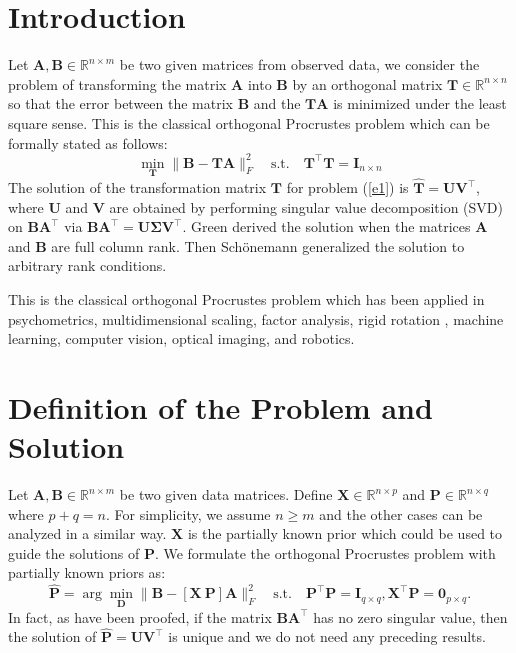 \documentclass[titlepage,11pt,twoside]{article}
\begin{document}
\section{Introduction}
Let $\mathbf{A},\mathbf{B}\in\mathbb{R}^{n\times m}$ be two given matrices from observed data, we consider the problem of transforming the matrix $\mathbf{A}$ into $\mathbf{B}$ by an orthogonal matrix $\mathbf{T}\in\mathbb{R}^{n\times n}$ so that the error between the matrix $\mathbf{B}$ and the $\mathbf{T}\mathbf{A}$ is minimized under the least square sense. This is the classical orthogonal Procrustes problem \cite{procrustesprogram} which can be formally stated as follows:
\begin{equation}\label{e1}
\min_{\mathbf{T}}\|\mathbf{B}-\mathbf{T}\mathbf{A}\|_{F}^{2}
\quad
\text{s.t.}
\quad
\mathbf{T}^{\top}\mathbf{T} = \mathbf{I}_{n\times n}
\end{equation}
The solution of the transformation matrix $\mathbf{T}$ for problem (\ref{e1}) is
$\mathbf{\hat{T}}=\mathbf{U}\mathbf{V}^{\top}$, where $\mathbf{U}$ and $\mathbf{V}$ are obtained by performing singular value decomposition (SVD) on $\mathbf{B}\mathbf{A}^{\top}$ via $\mathbf{B}\mathbf{A}^{\top}=\mathbf{U}\mathbf{\Sigma}\mathbf{V}^{\top}$. Green \cite{green1952orthogonal} derived the solution when the matrices $\mathbf{A}$ and $\mathbf{B}$ are full column rank. Then Sch{\"o}nemann \cite{schonemann1966generalized} generalized the solution to arbitrary rank conditions.


This is the classical orthogonal Procrustes problem \cite{procrustesprogram} which has been applied in psychometrics, multidimensional scaling, factor analysis, rigid rotation \cite{Berge2006}, machine learning, computer vision, optical imaging, and robotics.

\section{Definition of the Problem and Solution}
Let $\mathbf{A},\mathbf{B}\in \mathbb{R}^{n\times m}$ be two given data matrices. Define $\mathbf{X}\in\mathbb{R}^{n\times p}$ and $\mathbf{P}\in\mathbb{R}^{n\times q}$ where $p+q=n$. For simplicity, we assume $n\ge m$ and the other cases can be analyzed in a similar way. $\mathbf{X}$ is the partially known prior which could be used to guide the solutions of $\mathbf{P}$. We formulate the orthogonal Procrustes problem with partially known priors as:
\begin{equation}
\mathbf{\hat{P}}=\arg\min_{\mathbf{D}}\|\mathbf{B}-[\mathbf{X}\ \mathbf{P}]\mathbf{A}\|_{F}^{2}
\quad
\text{s.t.}
\quad
\mathbf{P}^{\top}\mathbf{P} = \mathbf{I}_{q\times q}, \mathbf{X}^{\top}\mathbf{P} = \mathbf{0}_{p\times q}.
\end{equation} 
In fact, as have been proofed, if the matrix $\mathbf{\mathbf{B}\mathbf{A}^{\top}}$ has no zero singular value, then the solution of  
$\mathbf{\hat{P}} = \mathbf{U}\mathbf{V}^{\top}$ is unique and we do not need any preceding results.
\end{document}
